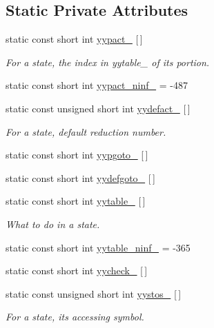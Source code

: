 \subsection*{Static Private Attributes}
\begin{DoxyCompactItemize}
\item 
static const short int \hyperlink{classyy_1_1_parser_implementation_a7401cd87b869c3bf46fb2c1eded0e01b}{yypact\_\-} \mbox{[}$\,$\mbox{]}
\begin{DoxyCompactList}\small\item\em For a state, the index in {\itshape yytable\_\-\/} of its portion. \end{DoxyCompactList}\item 
static const short int \hyperlink{classyy_1_1_parser_implementation_a85c960935be420c72af16a0400681917}{yypact\_\-ninf\_\-} = -\/487
\item 
static const unsigned short int \hyperlink{classyy_1_1_parser_implementation_a81c137fe508047a1ceebf394fc175495}{yydefact\_\-} \mbox{[}$\,$\mbox{]}
\begin{DoxyCompactList}\small\item\em For a state, default reduction number. \end{DoxyCompactList}\item 
static const short int \hyperlink{classyy_1_1_parser_implementation_ae6db415be91281c742e283e751832b8b}{yypgoto\_\-} \mbox{[}$\,$\mbox{]}
\item 
static const short int \hyperlink{classyy_1_1_parser_implementation_a96813fa8ea74a994f511555c305a24cd}{yydefgoto\_\-} \mbox{[}$\,$\mbox{]}
\item 
static const short int \hyperlink{classyy_1_1_parser_implementation_a7ff0dae4463142551743f4c28aa6c528}{yytable\_\-} \mbox{[}$\,$\mbox{]}
\begin{DoxyCompactList}\small\item\em What to do in a state. \end{DoxyCompactList}\item 
static const short int \hyperlink{classyy_1_1_parser_implementation_a77b627719b70a6e0abd7c6f61fe63fc8}{yytable\_\-ninf\_\-} = -\/365
\item 
static const short int \hyperlink{classyy_1_1_parser_implementation_a4e24c627ad1d965e70a148cd5506dc39}{yycheck\_\-} \mbox{[}$\,$\mbox{]}
\item 
static const unsigned short int \hyperlink{classyy_1_1_parser_implementation_a62806652360a422a003b04112c5d37bc}{yystos\_\-} \mbox{[}$\,$\mbox{]}
\begin{DoxyCompactList}\small\item\em For a state, its accessing symbol. \end{DoxyCompactList}\item 

\end{DoxyCompactItemize}
